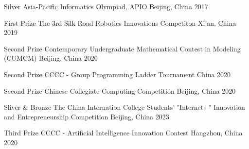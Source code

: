 \begin{cvhonors}

\cvhonor
{Silver} %
{Asia-Pacific Informatics Olympiad, APIO} %
{Beijing, China} %
{2017} %

\cvhonor
{First Prize} %
{The 3rd Silk Road Robotics Innovations Competiton} %
{Xi'an, China} %
{2019} %

\cvhonor
{Second Prize} %
{Contemporary Undergraduate Mathematical Contest in Modeling (CUMCM)} %
{Beijing, China} %
{2020} %

\cvhonor
{Second Prize} %
{CCCC - Group Programming Ladder Tournament} %
{China} %
{2020} %


\cvhonor
{Second Prize} %
{Chinese Collegiate Computing Competition} %
{Beijing, China} %
{2020} %


\cvhonor
{Sliver \& Bronze} %
{The China Internation College Students' "Internet+" Innovation and Entrepreneurship Competition} %
{Beijing, China} %
{2023} %

\cvhonor
{Third Prize} %
{CCCC - Artificial Intelligence Innovation Contest} %
{Hangzhou, China} %
{2020} %


\end{cvhonors}




